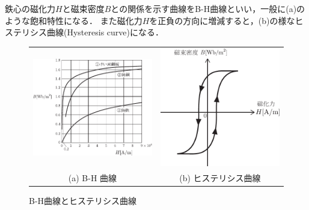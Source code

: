 鉄心の磁化力$H$と磁束密度$B$との関係を示す曲線をB-H曲線といい，一般に(a)のような飽和特性になる．
また磁化力$H$を正負の方向に増減すると，(b)の様なヒステリシス曲線(Hysteresis curve)になる．
\begin{figure}[htbp]
	\centering
	\begin{tabular}{cc}
		\includegraphics[width=70mm]{fig/bhcurve.pdf} &
		\includegraphics[width=70mm]{fig/hysteresis.pdf} \\
		(a) B-H 曲線 & (b) ヒステリシス曲線
	\end{tabular}
	\caption{B-H曲線とヒステリシス曲線}
	\label{fig:hys:bhcurve}
\end{figure}

